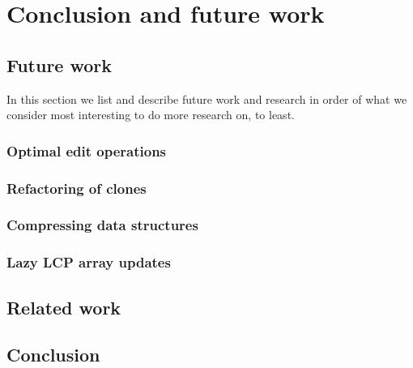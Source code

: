 \chapter{Conclusion and future work}

\section{Future work}

In this section we list and describe future work and research in order of what we consider
most interesting to do more research on, to least.


\subsection*{Optimal edit operations}

\subsection*{Refactoring of clones}

\subsection*{Compressing data structures}

\subsection*{Lazy LCP array updates}

\section{Related work}


\section{Conclusion}
